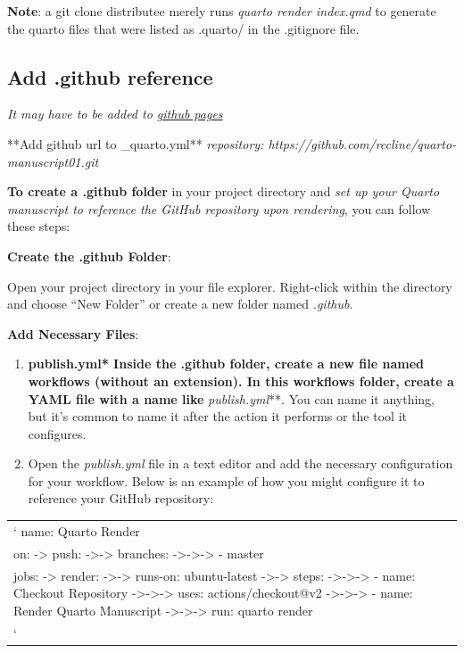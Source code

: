 \documentclass[
  letterpaper,
  DIV=11,
  numbers=noendperiod]{scrartcl}
\begin{document}
\textbf{Note}: a git clone distributee merely runs \emph{quarto render
index.qmd} to generate the quarto files that were listed as .quarto/ in
the .gitignore file.

\subsection{Add .github reference}\label{add-.github-reference}

\emph{It may have to be added to
\href{https://quarto.org/docs/publishing/github-pages.html}{github
pages}}

**Add github url to \_quarto.yml** \emph{repository:
https://github.com/rccline/quarto-manuscript01.git}

\textbf{To create a .github folder} in your project directory and
\emph{set up your Quarto manuscript to reference the GitHub repository
upon rendering}, you can follow these steps:

\textbf{Create the .github Folder}:

Open your project directory in your file explorer. Right-click within
the directory and choose ``New Folder'' or create a new folder named
\emph{.github}.

\textbf{Add Necessary Files}:

\begin{enumerate}
\def\labelenumi{\arabic{enumi}.}
\item
  \textbf{publish.yml* Inside the .github folder, create a new file
  named workflows (without an extension). In this workflows folder,
  create a YAML file with a name like }\emph{publish.yml}**. You can
  name it anything, but it's common to name it after the action it
  performs or the tool it configures.
\item
  Open the \emph{publish.yml} file in a text editor and add the
  necessary configuration for your workflow. Below is an example of how
  you might configure it to reference your GitHub repository:
\end{enumerate}

\begin{longtable}[]{@{}
  >{\raggedright\arraybackslash}p{}@{}}
\toprule\noalign{}
\endhead
\bottomrule\noalign{}
\endlastfoot
` name: Quarto Render \\
on: -\textgreater{} push: -\textgreater-\textgreater{} branches:
-\textgreater-\textgreater-\textgreater{} - master \\
jobs: -\textgreater{} render: -\textgreater-\textgreater{} runs-on:
ubuntu-latest -\textgreater-\textgreater{} steps:
-\textgreater-\textgreater-\textgreater{} - name: Checkout Repository
-\textgreater-\textgreater-\textgreater{} uses: actions/checkout@v2
-\textgreater-\textgreater-\textgreater{} - name: Render Quarto
Manuscript -\textgreater-\textgreater-\textgreater{} run: quarto
render \\
` \\
\end{longtable}
\end{document}
